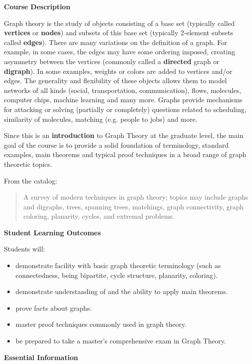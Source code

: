 \documentclass[12pt]{article}
\renewcommand{\emph}[1]{\textsf{\textbf{#1}}}
\begin{document}
\quad


\textbf{\large{Course Description}}

Graph theory is the study of objects consisting of a base set (typically called \emph{vertices} or \emph{nodes}) and subsets of this base set (typically 2-element subsets called \emph{edges}). There are many variations on the definition of a graph. For example, in some cases, the  edges may have some ordering imposed, creating asymmetry between the vertices (commonly called a \emph{directed} graph or \emph{digraph}). In some examples, weights or colors are added to vertices and/or edges. The generality and flexibility of these objects allows them to model networks of all kinds (social, transportation, communication), flows, molecules, computer chips, machine learning and many more. Graphs provide mechanisms for attacking or solving (partially or completely) questions related to scheduling, similarity of molecules, matching (e.g. people to jobs) and more.

Since this is an \emph{introduction} to Graph Theory at the graduate level, the main goal of the course is to provide a solid foundation of terminology, standard examples, main theorems and typical proof techniques in a broad range of graph theoretic topics.

From the catalog: \begin{quote} A survey of modern techniques in graph theory; topics may include graphs and digraphs, trees, spanning trees, matchings, graph connectivity, graph coloring, planarity, cycles, and extremal problems. \end{quote}

\textbf{\large{Student Learning Outcomes}} 

Students will: 
	\begin{itemize}
	\item demonstrate facility with basic graph theoretic terminology (such as connectedness, being bipartite, cycle structure, planarity, coloring).
	\item demonstrate understanding of and the ability to apply main theorems. 
	\item prove facts about graphs.
	\item master proof techniques commonly used in graph theory.
	\item be prepared to take a master's comprehensive exam in Graph Theory.
	\end{itemize}
	
\textbf{\large{Essential Information}}
\end{document}
